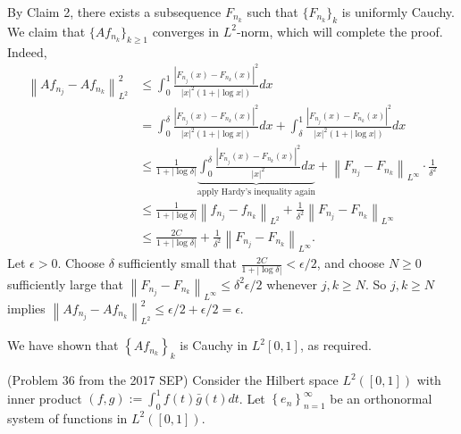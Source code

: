 \documentclass[answers]{exam}
\theoremstyle{problemstyle}
\newcommand{\norm}[1]{\left\lVert#1\right\rVert} %
\newcommand{\1}[1]{\textbf{1}_{\left[#1\right]}} %
\begin{document}
\begin{questions}
\begin{solution}
  By Claim 2, there exists a subsequence $F_{n_{k}}$ such that $\{F_{n_{k}}\}_{k}$ is uniformly Cauchy. We claim that $\{Af_{n_{k}}\}_{k\geq 1}$ converges in $L^{2}$-norm, which will complete the proof. Indeed,
  \begin{align*}
    \norm{Af_{n_{j}}-Af_{n_{k}}}_{L^{2}}^{2}
    &\leq \int_{0}^{1}\frac{|F_{n_{j}}(x)-F_{n_{k}}(x)|^{2}}{|x|^{2}\left( 1+|\log x| \right)} dx\\
    &= \int_{0}^{\delta}\frac{|F_{n_{j}}(x)-F_{n_{k}}(x)|^{2}}{|x|^{2}\left( 1+|\log x| \right)} dx + \int_{\delta}^{1}\frac{|F_{n_{j}}(x)-F_{n_{k}}(x)|^{2}}{|x|^{2}\left( 1+|\log x| \right)} dx\\
    &\leq \frac{1}{1+|\log \delta |} \underbrace{\int_{0}^{\delta}\frac{|F_{n_{j}}(x)-F_{n_{k}}(x)|^{2}}{|x|^{2}} dx}_{\text{apply Hardy's inequality again}} + \norm{F_{n_{j}}-F_{n_{k}}}_{L^{\infty}} \cdot\frac{1}{\delta^{2}}\\
    &\leq \frac{1}{1+|\log \delta |} \norm{f_{n_{j}}-f_{n_{k}}}_{L^{2}} + \frac{1}{\delta^{2}} \norm{F_{n_{j}}-F_{n_{k}}}_{L^{\infty}}\\
    &\leq \frac{2C}{1+|\log \delta|} + \frac{1}{\delta^{2}} \norm{F_{n_{j}}-F_{n_{k}}}_{L^{\infty}}.
  \end{align*}
  Let $\epsilon>0$. Choose $\delta$ sufficiently small that $\frac{2C}{1+|\log \delta|}<\epsilon/2$, and choose $N\geq 0$ sufficiently large that $\norm{F_{n_{j}}-F_{n_{k}}}_{L^{\infty}}\leq \delta^{2}\epsilon/2$ whenever $j,k\geq N$. So $j,k\geq N$ implies $\norm{Af_{n_{j}}-Af_{n_{k}}}_{L^{2}}^{2} \leq \epsilon/2 + \epsilon/2= \epsilon$.
  
  We have shown that $\left\{ Af_{n_{k}} \right\}_{k}$ is Cauchy in $L^2[0,1]$, as required.
\end{solution}


\question (Problem 36 from the 2017 SEP) Consider the Hilbert space $L^{2}([0,1])$ with inner product $(f,g):=\int_{0}^{1}f(t)\bar{g}(t)dt$. Let $\left\{ e_{n} \right\}_{n=1}^{\infty}$ be an orthonormal system of functions in $L^{2}([0,1])$.
\end{questions}
\end{document}
